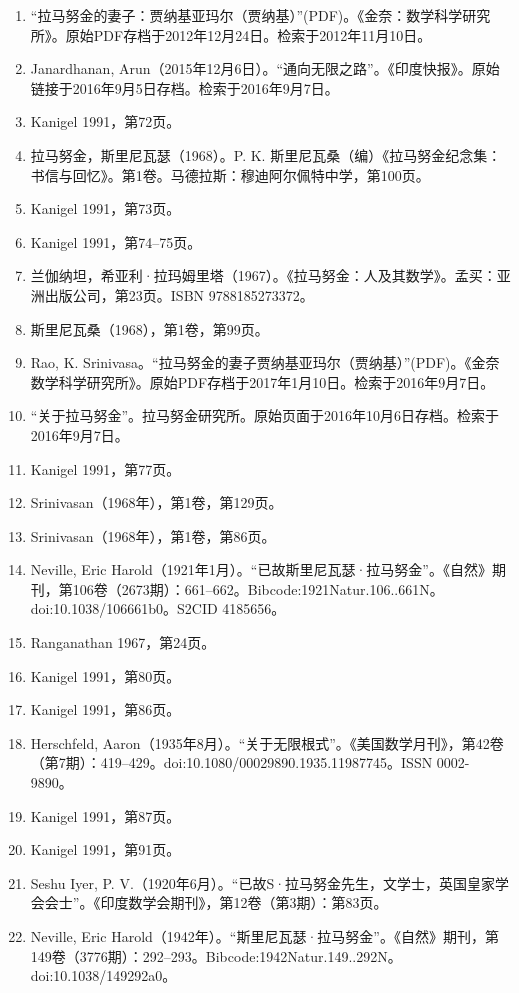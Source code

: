 \begin{enumerate}
\item “拉马努金的妻子：贾纳基亚玛尔（贾纳基）”(PDF)。《金奈：数学科学研究所》。原始PDF存档于2012年12月24日。检索于2012年11月10日。
\item Janardhanan, Arun（2015年12月6日）。“通向无限之路”。《印度快报》。原始链接于2016年9月5日存档。检索于2016年9月7日。
\item Kanigel 1991，第72页。
\item 拉马努金，斯里尼瓦瑟（1968）。P. K. 斯里尼瓦桑（编）《拉马努金纪念集：书信与回忆》。第1卷。马德拉斯：穆迪阿尔佩特中学，第100页。
\item Kanigel 1991，第73页。
\item Kanigel 1991，第74–75页。
\item 兰伽纳坦，希亚利·拉玛姆里塔（1967）。《拉马努金：人及其数学》。孟买：亚洲出版公司，第23页。ISBN 9788185273372。
\item 斯里尼瓦桑（1968），第1卷，第99页。
\item Rao, K. Srinivasa。“拉马努金的妻子贾纳基亚玛尔（贾纳基）”(PDF)。《金奈数学科学研究所》。原始PDF存档于2017年1月10日。检索于2016年9月7日。
\item “关于拉马努金”。拉马努金研究所。原始页面于2016年10月6日存档。检索于2016年9月7日。
\item Kanigel 1991，第77页。
\item Srinivasan（1968年），第1卷，第129页。
\item Srinivasan（1968年），第1卷，第86页。
\item Neville, Eric Harold（1921年1月）。“已故斯里尼瓦瑟·拉马努金”。《自然》期刊，第106卷（2673期）：661–662。Bibcode:1921Natur.106..661N。doi:10.1038/106661b0。S2CID 4185656。
\item Ranganathan 1967，第24页。
\item Kanigel 1991，第80页。
\item Kanigel 1991，第86页。
\item Herschfeld, Aaron（1935年8月）。“关于无限根式”。《美国数学月刊》，第42卷（第7期）：419–429。doi:10.1080/00029890.1935.11987745。ISSN 0002-9890。
\item Kanigel 1991，第87页。
\item Kanigel 1991，第91页。
\item Seshu Iyer, P. V.（1920年6月）。“已故S·拉马努金先生，文学士，英国皇家学会会士”。《印度数学会期刊》，第12卷（第3期）：第83页。
\item Neville, Eric Harold（1942年）。“斯里尼瓦瑟·拉马努金”。《自然》期刊，第149卷（3776期）：292–293。Bibcode:1942Natur.149..292N。doi:10.1038/149292a0。

\end{enumerate}
